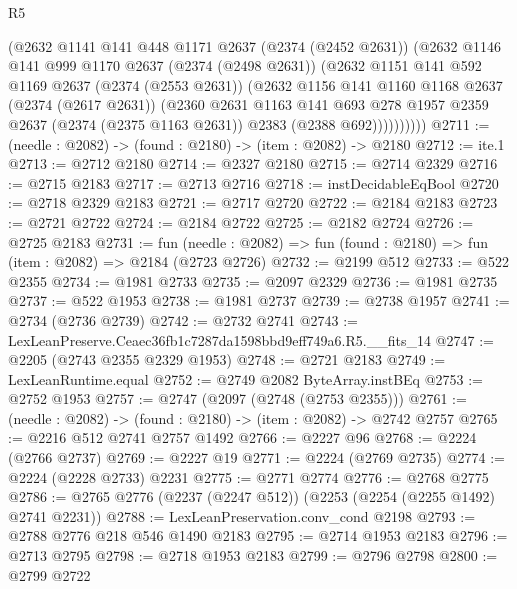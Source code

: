 \begin{lexlean}{R5}
\begin{coremodule}
            (@2632
              @1141
              @141
              @448
              @1171
              @2637
              (@2374 (@2452 @2631))
              (@2632
                @1146
                @141
                @999
                @1170
                @2637
                (@2374 (@2498 @2631))
                (@2632
                  @1151
                  @141
                  @592
                  @1169
                  @2637
                  (@2374 (@2553 @2631))
                  (@2632
                    @1156
                    @141
                    @1160
                    @1168
                    @2637
                    (@2374 (@2617 @2631))
                    (@2360
                      @2631
                      @1163
                      @141
                      @693
                      @278
                      @1957
                      @2359
                      @2637
                      (@2374 (@2375 @1163 @2631))
                      @2383
                      (@2388 @692))))))))))
@2711 := (needle : @2082) -> (found : @2180) -> (item : @2082) -> @2180
@2712 := ite.{1}
@2713 := @2712 @2180
@2714 := @2327 @2180
@2715 := @2714 @2329
@2716 := @2715 @2183
@2717 := @2713 @2716
@2718 := instDecidableEqBool
@2720 := @2718 @2329 @2183
@2721 := @2717 @2720
@2722 := @2184 @2183
@2723 := @2721 @2722
@2724 := @2184 @2722
@2725 := @2182 @2724
@2726 := @2725 @2183
@2731 := fun (needle : @2082) => fun (found : @2180) => fun (item : @2082) => @2184 (@2723 @2726)
@2732 := @2199 @512
@2733 := @522 @2355
@2734 := @1981 @2733
@2735 := @2097 @2329
@2736 := @1981 @2735
@2737 := @522 @1953
@2738 := @1981 @2737
@2739 := @2738 @1957
@2741 := @2734 (@2736 @2739)
@2742 := @2732 @2741
@2743 := LexLeanPreserve.Ceaec36fb1c7287da1598bbd9eff749a6.R5.__fits_14
@2747 := @2205 (@2743 @2355 @2329 @1953)
@2748 := @2721 @2183
@2749 := LexLeanRuntime.equal
@2752 := @2749 @2082 ByteArray.instBEq
@2753 := @2752 @1953
@2757 := @2747 (@2097 (@2748 (@2753 @2355)))
@2761 := (needle : @2082) -> (found : @2180) -> (item : @2082) -> @2742 @2757
@2765 := @2216 @512 @2741 @2757 @1492
@2766 := @2227 @96
@2768 := @2224 (@2766 @2737)
@2769 := @2227 @19
@2771 := @2224 (@2769 @2735)
@2774 := @2224 (@2228 @2733) @2231
@2775 := @2771 @2774
@2776 := @2768 @2775
@2786 := @2765 @2776 (@2237 (@2247 @512)) (@2253 (@2254 (@2255 @1492) @2741 @2231))
@2788 := LexLeanPreservation.conv_cond @2198
@2793 := @2788 @2776 @218 @546 @1490 @2183
@2795 := @2714 @1953 @2183
@2796 := @2713 @2795
@2798 := @2718 @1953 @2183
@2799 := @2796 @2798
@2800 := @2799 @2722

\end{coremodule}
\end{lexlean}

